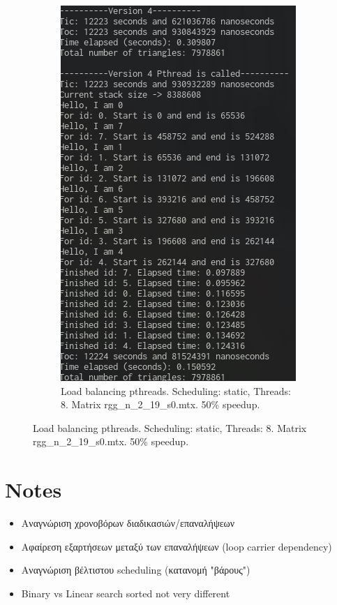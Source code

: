 \documentclass[12pt, a4paper]{article}
\begin{document}
\begin{figure}[h!]
\begin{subfigure}[b]{0.45\textwidth}
         \includegraphics[height=.3\textheight, width=\textwidth, keepaspectratio]{assets/load_pthreads2.png}
         \caption{Load balancing pthreads. Scheduling: static, Threads: 8. Matrix rgg\_n\_2\_19\_s0.mtx. 50\% speedup.}
     \end{subfigure}
\end{figure}

\section{Notes}
\begin{itemize}
    \item Αναγνώριση χρονοβόρων διαδικασιών/επαναλήψεων
    \item Αφαίρεση εξαρτήσεων μεταξύ των επαναλήψεων (loop carrier dependency)
    \item Αναγνώριση βέλτιστου scheduling (κατανομή "βάρους")
    \item Binary vs Linear search sorted not very different
\end{itemize}
\end{document}

